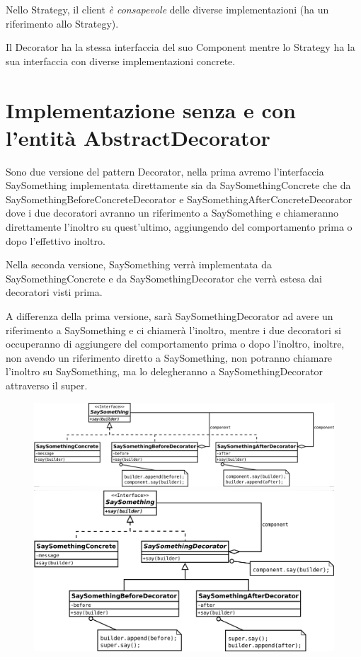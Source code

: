 Nello Strategy, il client \textit{è consapevole} delle diverse implementazioni (ha un riferimento allo Strategy).

Il Decorator ha la stessa interfaccia del suo Component mentre lo Strategy ha la sua interfaccia con diverse implementazioni concrete.

\section{Implementazione senza e con l'entità AbstractDecorator}

Sono due versione del pattern Decorator, nella prima avremo l'interfaccia SaySomething implementata direttamente sia da SaySomethingConcrete che da 
SaySomethingBeforeConcreteDecorator e SaySomethingAfterConcreteDecorator dove i due decoratori avranno un riferimento a SaySomething e chiameranno direttamente 
l'inoltro su quest'ultimo, aggiungendo del comportamento prima o dopo l'effettivo inoltro.

Nella seconda versione, SaySomething verrà implementata da SaySomethingConcrete e da SaySomethingDecorator che verrà estesa dai decoratori visti prima.

A differenza della prima versione, sarà SaySomethingDecorator ad avere un riferimento a SaySomething e ci chiamerà l'inoltro, mentre i due decoratori si occuperanno di 
aggiungere del comportamento prima o dopo l'inoltro, inoltre, non avendo un riferimento diretto a SaySomething, non potranno chiamare l'inoltro su SaySomething, ma lo 
delegheranno a SaySomethingDecorator attraverso il super.

\begin{figure}[H]
\begin{minipage}[c]{9cm}
    \includegraphics[width=1\linewidth]{../../immagini/decorator/senza_AbstractDecorator}
\end{minipage}
\hfill
\begin{minipage}[c]{8cm}
    \includegraphics[width=1\linewidth]{../../immagini/decorator/con_AbstractDecorator}
\end{minipage}
\end{figure}

